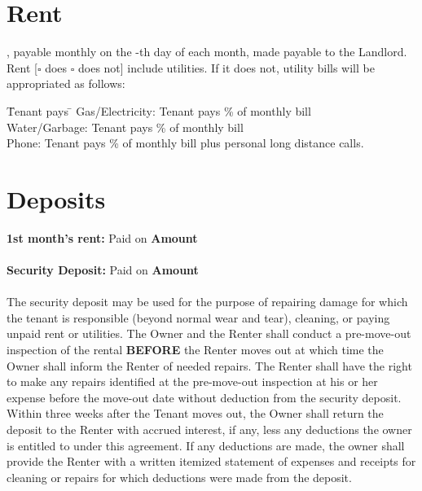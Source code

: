 \documentclass[12pt]{article}
\begin{document}
\section*{Rent}
\noindent \textdollar\underline{\hspace{1in}}, payable monthly on the \underline{\hspace{1in}}-th day of each month, made payable to the Landlord. \\
\vspace{24pt}
\noindent Rent [$\square$ does $\square$ does not] include utilities. If it does not, utility bills will be appropriated as follows:
\begin{tabbing}
\hspace{1.5in} \= Tenant pays \hspace{0.5in} \= \kill
Gas/Electricity: \> Tenant pays \> \underline{\hspace{1in}} \% of monthly bill \\
Water/Garbage: \> Tenant pays \> \underline{\hspace{1in}} \% of monthly bill \\
Phone: \> Tenant pays \> \underline{\hspace{1in}} \% of monthly bill plus personal long distance calls.
\end{tabbing}



\newpage
\section*{Deposits}
\noindent \textbf{1st month's rent:} Paid on \underline{\hspace{1in}} \hspace{0.5in} \textbf{Amount} \textdollar\underline{\hspace{1in}} \\
\vspace{12pt} \\
\textbf{Security Deposit:} Paid on \underline{\hspace{1in}} \hspace{0.5in} \textbf{Amount} \textdollar\underline{\hspace{1in}} \\
\vspace{12pt} \\
\noindent The security deposit may be used for the purpose of repairing damage for which the tenant is responsible (beyond normal wear and tear), cleaning, or paying unpaid rent or utilities. The Owner and the Renter shall conduct a pre-move-out inspection of the rental \textbf{BEFORE} the Renter moves out at which time the Owner shall inform the Renter of needed repairs. The Renter shall have the right to make any repairs identified at the pre-move-out inspection at his or her expense before the move-out date without deduction from the security deposit. Within three weeks after the Tenant moves out, the Owner shall return the deposit to the Renter with accrued interest, if any, less any deductions the owner is entitled to under this agreement. If any deductions are made, the owner shall provide the Renter with a written itemized statement of expenses and receipts for cleaning or repairs for which deductions were made from the deposit.
\end{document}

